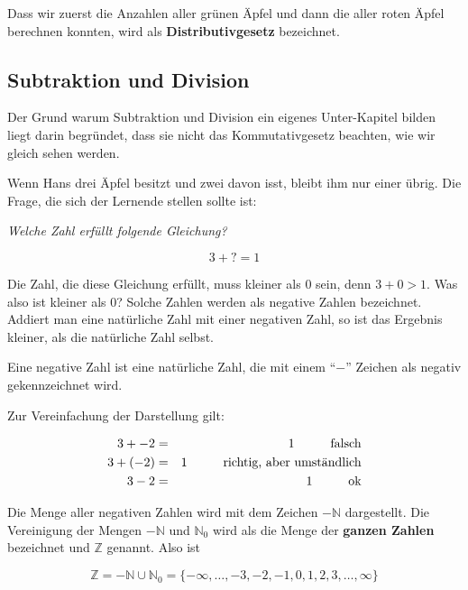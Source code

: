Dass wir zuerst die Anzahlen aller grünen Äpfel und dann die aller roten Äpfel berechnen konnten, wird als  \textbf{Distributivgesetz} bezeichnet.

\subsection{Subtraktion und Division}

Der Grund warum Subtraktion und Division ein eigenes Unter-Kapitel bilden liegt darin begründet, dass sie nicht das Kommutativgesetz beachten, wie wir gleich sehen werden.

Wenn Hans drei Äpfel besitzt und zwei davon isst, bleibt ihm nur einer übrig. Die Frage, die sich der Lernende stellen sollte ist:

\textsl{Welche Zahl erfüllt folgende Gleichung?}

\[3 + ? = 1\]

Die Zahl, die diese Gleichung erfüllt, muss kleiner als 0 sein, denn $3+0 > 1$. Was also ist kleiner als 0? Solche Zahlen werden als negative Zahlen bezeichnet. Addiert man eine natürliche Zahl mit einer negativen Zahl, so ist das Ergebnis kleiner, als die natürliche Zahl selbst. 

\begin{definition}
Eine negative Zahl ist eine natürliche Zahl, die mit einem "`$-$"' Zeichen als negativ gekennzeichnet wird. 
\end{definition}

Zur Vereinfachung der Darstellung gilt:

\begin{eqnarray*}
3 + -2 &=& 1 \hspace{1cm}\textnormal{falsch}\\
3 + (-2) &=& 1 \hspace{1cm}\textnormal{richtig, aber umständlich}\\
3 - 2  &=& 1 \hspace{1cm}\textnormal{ok}
\end{eqnarray*}

Die Menge aller negativen Zahlen wird mit dem Zeichen $-\mathbb{N} $ dargestellt. Die Vereinigung der Mengen $-\mathbb{N} $ und $\mathbb{N}_0$ wird als die Menge der \textbf{ganzen Zahlen} bezeichnet und $\mathbb{Z}$ genannt. Also ist 

\[
\mathbb{Z} = -\mathbb{N} \cup \mathbb{N}_0 =  \{ -\infty, \dots, -3, -2, -1, 0, 1, 2, 3, \dots, \infty \}
\]

